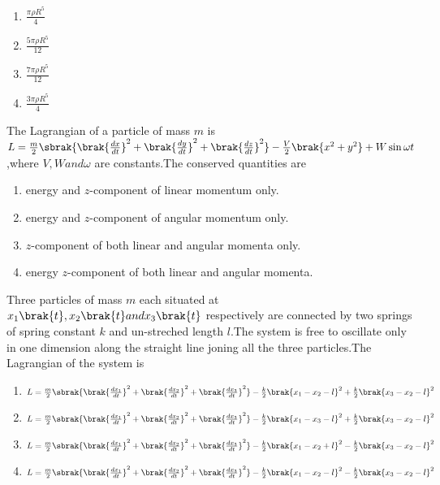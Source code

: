      \begin{enumerate}
         \item $\frac{\pi \rho R^5}{4}$
         \item $\frac{5\pi \rho R^5}{12}$
         \item $\frac{7\pi \rho R^5}{12}$
         \item $\frac{3\pi \rho R^5}{4}$
     \end{enumerate}
     \item The Lagrangian of a particle of mass $m$ is $L=\frac{m}{2}\sbrak{\brak{\frac{dx}{dt}}^2+\brak{\frac{dy}{dt}}^2+\brak{\frac{dz}{dt}}^2}-\frac{V}{2}\brak{x^2+y^2}+W\sin{\omega t}$,where $V,W and \omega$ are constants.The conserved quantities are
     \begin{enumerate}
         \item energy and $z$-component of linear momentum only.
         \item  energy and $z$-component of angular
         momentum only.
         \item $z$-component of both linear and angular momenta only.
         \item energy $z$-component of both linear and angular momenta.
     \end{enumerate}
     \item Three particles of mass $m$ each situated at $x_{1}\brak{t},x_{2}\brak{t}and x_{3}\brak{t}$ respectively are connected by two springs of spring constant $k$ and un-streched length $l$.The system is free to oscillate only in one dimension along the straight line joning all the three particles.The Lagrangian of the system is
     \begin{enumerate}
         \item$ L=\frac{m}{2}\sbrak{\brak{\frac{dx_{1}}{dt}}^2+\brak{\frac{dx_{2}}{dt}}^2+\brak{\frac{dx_{3}}{dt}}^2}-\frac{k}{2}\brak{x_{1}-x_{2}-l}^2+\frac{k}{2}\brak{
         x_{3}-x_{2}-l}^2$
          \item$ L=\frac{m}{2}\sbrak{\brak{\frac{dx_{1}}{dt}}^2+\brak{\frac{dx_{2}}{dt}}^2+\brak{\frac{dx_{3}}{dt}}^2}-\frac{k}{2}\brak{x_{1}-x_{3}-l}^2+\frac{k}{2}\brak{
         x_{3}-x_{2}-l}^2$
          \item$ L=\frac{m}{2}\sbrak{\brak{\frac{dx_{1}}{dt}}^2+\brak{\frac{dx_{2}}{dt}}^2+\brak{\frac{dx_{3}}{dt}}^2}-\frac{k}{2}\brak{x_{1}-x_{2}+l}^2-\frac{k}{2}\brak{
         x_{3}-x_{2}-l}^2$
         \item$ L=\frac{m}{2}\sbrak{\brak{\frac{dx_{1}}{dt}}^2+\brak{\frac{dx_{2}}{dt}}^2+\brak{\frac{dx_{3}}{dt}}^2}-\frac{k}{2}\brak{x_{1}-x_{2}-l}^2-\frac{k}{2}\brak{
         x_{3}-x_{2}-l}^2$
     \end{enumerate}
